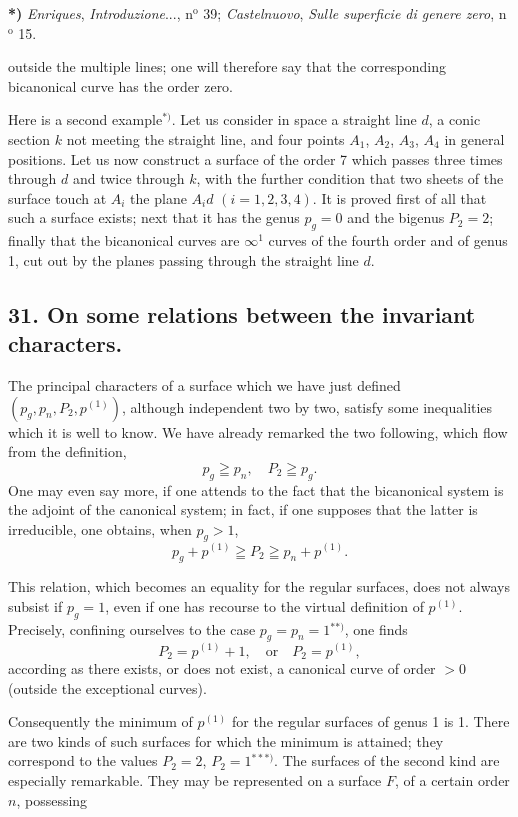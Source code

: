 \documentclass{article}
\begin{document}
\textbf{*)} \emph{Enriques}, \emph{Introduzione}..., n${}^{\text{o}}$ 39; \emph{Castelnuovo}, \emph{Sulle superficie di genere zero}, n${}^{\text{o}}$ 15.

outside the multiple lines; one will therefore say that the corresponding bicanonical curve has the order zero.

Here is a second example${}^{*)}$. Let us consider in space a straight line $d$, a conic section $k$ not meeting the straight line, and four points $A_{1}$, $A_{2}$, $A_{3}$, $A_{4}$ in general positions. Let us now construct a surface of the order 7 which passes three times through $d$ and twice through $k$, with the further condition that two sheets of the surface touch at $A_{i}$ the plane $A_{i}d$ $(i = 1, 2, 3, 4)$. It is proved first of all that such a surface exists; next that it has the genus $p_{g} = 0$ and the bigenus $P_{2} = 2$; finally that the bicanonical curves are $\infty^{1}$ curves of the fourth order and of genus 1, cut out by the planes passing through the straight line $d$.

\subsection*{31. On some relations between the invariant characters.}

The principal characters of a surface which we have just defined $(p_{g}, p_{n}, P_{2}, p^{(1)})$, although independent two by two, satisfy some inequalities which it is well to know. We have already remarked the two following, which flow from the definition,
\[ p_{g} \geqq p_{n}, \quad P_{2} \geqq p_{g}. \]
One may even say more, if one attends to the fact that the bicanonical system is the adjoint of the canonical system; in fact, if one supposes that the latter is irreducible, one obtains, when $p_{g} > 1$,
\[ p_{g} + p^{(1)} \geqq P_{2} \geqq p_{n} + p^{(1)}. \]

This relation, which becomes an equality for the regular surfaces, does not always subsist if $p_{g} = 1$, even if one has recourse to the virtual definition of $p^{(1)}$. Precisely, confining ourselves to the case $p_{g} = p_{n} = 1$${}^{**)}$, one finds
\[ P_{2} = p^{(1)} + 1, \quad \text{or} \quad P_{2} = p^{(1)}, \]
according as there exists, or does not exist, a canonical curve of order $> 0$ (outside the exceptional curves).

Consequently the minimum of $p^{(1)}$ for the regular surfaces of genus 1 is 1. There are two kinds of such surfaces for which the minimum is attained; they correspond to the values $P_{2} = 2$, $P_{2} = 1$${}^{***)}$. The surfaces of the second kind are especially remarkable. They may be represented on a surface $F$, of a certain order $n$, possessing
\end{document}
